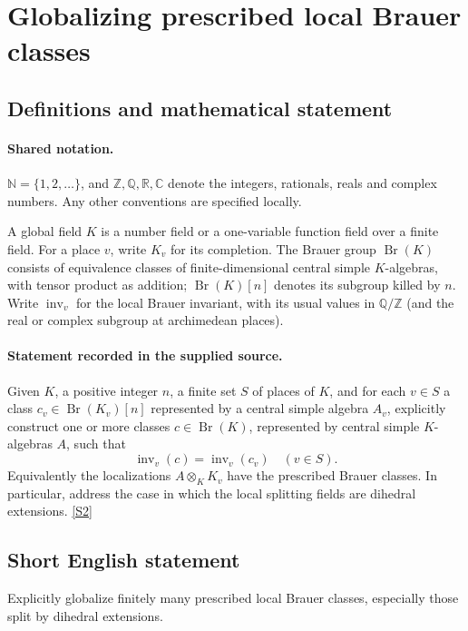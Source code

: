 \documentclass[11pt]{article}
\newcommand{\sref}[2]{\hyperlink{source:#1:#2}{[S#2]}}
\begin{document}
\section{Globalizing prescribed local Brauer classes}\label{statement}

\subsection{Definitions and mathematical statement}

\paragraph{Shared notation.}$\mathbb N=\{1,2,\ldots\}$, and $\mathbb Z,\mathbb Q,\mathbb R,\mathbb C$ denote the integers, rationals, reals and complex numbers. Any other conventions are specified locally.


A global field $K$ is a number field or a one-variable function field over a finite field. For a place $v$, write $K_v$ for its completion. The Brauer group $\operatorname{Br}(K)$ consists of equivalence classes of finite-dimensional central simple $K$-algebras, with tensor product as addition; $\operatorname{Br}(K)[n]$ denotes its subgroup killed by $n$. Write $\operatorname{inv}_v$ for the local Brauer invariant, with its usual values in $\mathbb Q/\mathbb Z$ (and the real or complex subgroup at archimedean places).
\paragraph{Statement recorded in the supplied source.}
Given $K$, a positive integer $n$, a finite set $S$ of places of $K$, and for each $v\in S$ a class $c_v\in\operatorname{Br}(K_v)[n]$ represented by a central simple algebra $A_v$, explicitly construct one or more classes $c\in\operatorname{Br}(K)$, represented by central simple $K$-algebras $A$, such that
\[
\operatorname{inv}_v(c)=\operatorname{inv}_v(c_v)\quad(v\in S).
\]
Equivalently the localizations $A\otimes_KK_v$ have the prescribed Brauer classes. In particular, address the case in which the local splitting fields are dihedral extensions. \sref{statement}{2}

\subsection{Short English statement}
Explicitly globalize finitely many prescribed local Brauer classes, especially those split by dihedral extensions.
\end{document}
